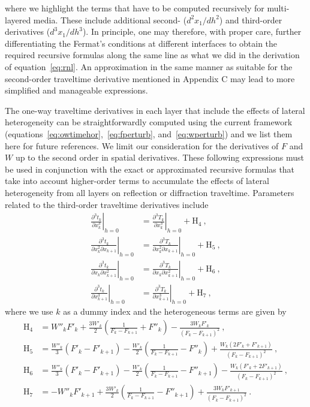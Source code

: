 where we highlight the terms that have to be computed recursively for multi-layered media. These include additional second- ($d^2 x_1 / d h^2$) and third-order derivatives ($d^3 x_1 / d h^3$). In principle, one may therefore, with proper care, further differentiating the Fermat's conditions at different interfaces to obtain the required recursive formulas along the same line as what we did in the derivation of equation~\ref{eq:rnl}. An approximation in the same manner as \cite{blias2006} suitable for the second-order traveltime derivative mentioned in Appendix C may lead to more simplified and manageable expressions. 

The one-way traveltime derivatives in each layer that include the effects of lateral heterogeneity can be straightforwardly computed using the current framework (equations~\ref{eq:owtimehor},~\ref{eq:fperturb}, and~\ref{eq:wperturb}) and we list them here for future references. We limit our consideration for the derivatives of $F$ and $W$ up to the second order in spatial derivatives. These following expressions must be used in conjunction with the exact or approximated recursive formulas that take into account higher-order terms to accumulate the effects of lateral heterogeneity from all layers on reflection or diffraction traveltime. Parameters related to the third-order traveltime derivatives include
\begin{align}
\left. \frac{\partial^3 t_k }{\partial x_k^3}\right\rvert_{h=0} & =  \left. \frac{\partial^3 T_k }{\partial x_k^3}\right\rvert_{h=0} + \text{H}_4~,\\
\nonumber
\left. \frac{\partial^3 t_k }{\partial x_k^2 \partial x_{k+1}}\right\rvert_{h=0} & =  \left. \frac{\partial^3 T_k }{\partial x_k^2 \partial x_{k+1}}\right\rvert_{h=0} + \text{H}_5~,\\
\nonumber
\left. \frac{\partial^3 t_k }{\partial x_k \partial x_{k+1}^2}\right\rvert_{h=0} & =  \left. \frac{\partial^3 T_k }{\partial x_k \partial x_{k+1}^2}\right\rvert_{h=0} + \text{H}_6~,\\
\nonumber
\left. \frac{\partial^3 t_k }{\partial x_{k+1}^3}\right\rvert_{h=0} & =  \left. \frac{\partial^3 T_k }{\partial x_{k+1}^3}\right\rvert_{h=0} + \text{H}_7~,
\end{align}
where we use $k$ as a dummy index and the heterogeneous terms are given by
\begin{align}
\text{H}_4 & = W''_kF'_{k} + \frac{3W'_k}{2}\left(\frac{1}{F_k-F_{k+1}} + F''_{k} \right) - \frac{3 W_k F'_{k} }{(F_k-F_{k+1})^2} ~,\\
\nonumber
\text{H}_5 & = \frac{W''_k}{3} (F'_{k}- F'_{k+1}) - \frac{W'_k}{2} \left(\frac{1}{F_k-F_{k+1}} - F''_{k} \right) + \frac{ W_k (2F'_{k}+ F'_{k+1}) }{(F_k-F_{k+1})^2}~,\\
\nonumber
\text{H}_6 & = \frac{W''_k}{3} (F'_{k}- F'_{k+1}) - \frac{W'_k}{2} \left(\frac{1}{F_k-F_{k+1}} - F''_{k+1}\right) - \frac{ W_k (F'_{k}+ 2F'_{k+1}) }{(F_k-F_{k+1})^2}~,\\
\nonumber
\text{H}_7 & =  -W''_kF'_{k+1} + \frac{3W'_k}{2}\left(\frac{1}{F_k-F_{k+1}} - F''_{k+1} \right) + \frac{3 W_k F'_{k+1} }{(F_k-F_{k+1})^2} ~.
\end{align}
